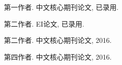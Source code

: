 
\begin{publications}{99}
    \item\textsc{第一作者}. {中文核心期刊论文}, 已录用.  
    \item\textsc{第二作者}. {EI论文}, 已录用.
    \item\textsc{第二作者}. {中文核心期刊论文}, 2016.  
    \item\textsc{第四作者}. {中文核心期刊论文}, 2016.
\end{publications}
